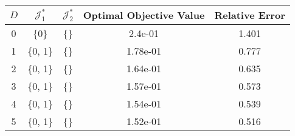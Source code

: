 \begin{subtable}{\textwidth}
\centering
\begin{tabular}{|c|c|c|c|c|}
  \hline
$D$ & $\mathcal J_1^*$ & $\mathcal J_2^*$ & Optimal Objective Value & Relative Error \\ 
  \hline
0 & \{0\} & \{\} & 2.4e-01 & 1.401 \\ 
  1 & \{0, 1\} & \{\} & 1.78e-01 & 0.777 \\ 
  2 & \{0, 1\} & \{\} & 1.64e-01 & 0.635 \\ 
  3 & \{0, 1\} & \{\} & 1.57e-01 & 0.573 \\ 
  4 & \{0, 1\} & \{\} & 1.54e-01 & 0.539 \\ 
  5 & \{0, 1\} & \{\} & 1.52e-01 & 0.516 \\ 
   \hline
\end{tabular}
\end{subtable}
